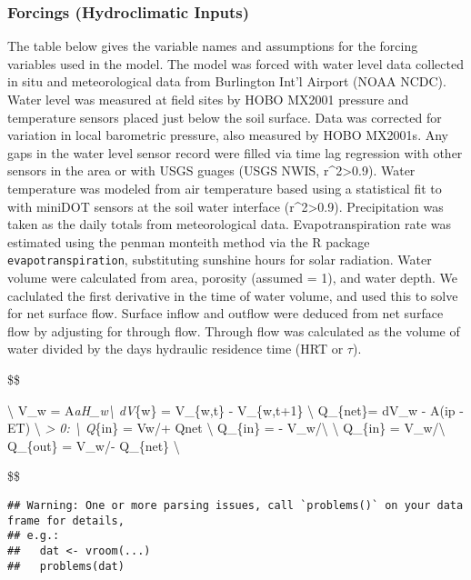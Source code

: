 \documentclass[
]{article}
\begin{document}
\hypertarget{forcings-hydroclimatic-inputs}{%
\subsubsection{Forcings (Hydroclimatic
Inputs)}\label{forcings-hydroclimatic-inputs}}

The table below gives the variable names and assumptions for the forcing
variables used in the model. The model was forced with water level data
collected in situ and meteorological data from Burlington Int'l Airport
(NOAA NCDC). Water level was measured at field sites by HOBO MX2001
pressure and temperature sensors placed just below the soil surface.
Data was corrected for variation in local barometric pressure, also
measured by HOBO MX2001s. Any gaps in the water level sensor record were
filled via time lag regression with other sensors in the area or with
USGS guages (USGS NWIS, r\^{}2\textgreater0.9). Water temperature was
modeled from air temperature based using a statistical fit to with
miniDOT sensors at the soil water interface (r\^{}2\textgreater0.9).
Precipitation was taken as the daily totals from meteorological data.
Evapotranspiration rate was estimated using the penman monteith method
via the R package \texttt{evapotranspiration}, substituting sunshine
hours for solar radiation. Water volume were calculated from area,
porosity (assumed = 1), and water depth. We caclulated the first
derivative in the time of water volume, and used this to solve for net
surface flow. Surface inflow and outflow were deduced from net surface
flow by adjusting for through flow. Through flow was calculated as the
volume of water divided by the days hydraulic residence time (HRT or
\(\tau\)).

\$\$

\textbackslash{} V\_w =
A\rho\emph{aH\_w\textbackslash{} dV}\{w\} = V\_\{w,t\} - V\_\{w,t+1\}
\textbackslash{} Q\_\{net\}= dV\_w - A(ip - ET) \textbackslash{}
\emph{ \textgreater{} 0: \textbackslash{} Q}\{in\}
= Vw/\tau + Qnet \textbackslash{} Q\_\{in\} = -
V\_w/\tau \textbackslash{}  \textbackslash{} Q\_\{in\} =
V\_w/\tau \textbackslash{} Q\_\{out\} = V\_w/\tau - Q\_\{net\}
\textbackslash{}

\$\$

\begin{verbatim}
## Warning: One or more parsing issues, call `problems()` on your data frame for details,
## e.g.:
##   dat <- vroom(...)
##   problems(dat)
\end{verbatim}
\end{document}
